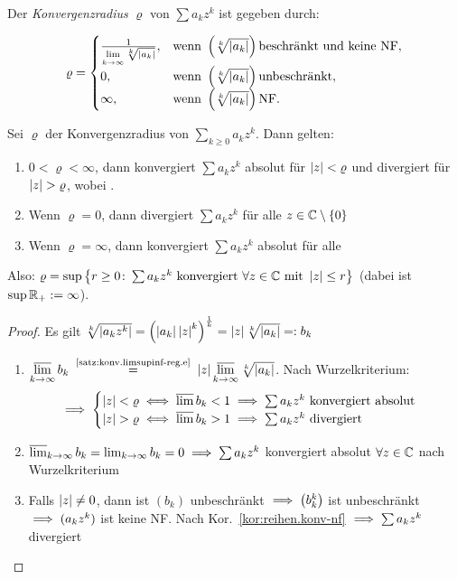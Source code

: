\documentclass[12pt]{scrreprt}
\begin{document}
\begin{dfn}\label{dfn:reihen.konvradius}
Der \emph{Konvergenzradius} $\varrho$ von $\sum a_kz^k$ ist gegeben durch:

\[\varrho = 
\begin{cases}
	\frac{1}{\lim\limits_{k\rightarrow\infty}\sqrt[k]{\left\lvert a_k\right\lvert}},	& \text{wenn } \left(\sqrt[k]{\left\lvert a_k\right\lvert}\right) \text{beschränkt und keine NF},\\
	0,											& \text{wenn } \left(\sqrt[k]{\left\lvert a_k\right\lvert}\right) \text{unbeschränkt},\\
	\infty,										& \text{wenn } \left(\sqrt[k]{\left\lvert a_k\right\lvert}\right) \text{NF}.
\end{cases}\]
\end{dfn}

\begin{thm}\label{thm:reihen.konvradius}
Sei $\varrho$ der Konvergenzradius von $\sum_{k \ge 0} a_kz^k$. Dann gelten:
\begin{enumerate}
\item $0 < \varrho < \infty$, dann konvergiert $\sum a_kz^k$ absolut für $\left\lvert z\right\lvert < \varrho$
und divergiert für $\left\lvert z\right\lvert > \varrho$, wobei .\label{thm:reihen.konvradius.a}
\item Wenn $\varrho = 0$, dann divergiert $\sum a_kz^k$ für alle $z\in\mathbb{C}\setminus\{0\}$\label{thm:reihen.konvradius.b}
\item Wenn $\varrho = \infty$, dann konvergiert $\sum a_kz^k$ absolut für alle \label{thm:reihen.konvradius.c}
\end{enumerate}
Also: $\varrho = \sup \left\{r \ge 0\colon \sum a_kz^k\text{ konvergiert }\forall z\in\mathbb{C}\text{ mit }\left\lvert z\right\lvert \le r\right\}$ 
(dabei ist $\sup \mathbb{R}_+ := \infty$).
\end{thm}
\begin{proof}
Es gilt $\sqrt[k]{\left\lvert a_kz^k\right\lvert} = \left(\left\lvert a_k\right\lvert\left\lvert z\right\lvert^k\right)^{\frac{1}{k}} = \left\lvert z\right\lvert\sqrt[k]{\left\lvert a_k\right\lvert} =: b_k$
\begin{enumerate}
\item $\ls\limits_{\kinf} b_k \nach{=}{\ref{satz:konv.limsupinf-reg.e}} \abs{z}\ls\limits_{\kinf}\sqrt[k]{\abs{a_k}}$.
Nach Wurzelkriterium: \[\implies \begin{cases}
	\left\lvert z\right\lvert < \varrho \iff \varlimsup b_k < 1 \implies \sum a_kz^k\text{ konvergiert absolut}\\
	\left\lvert z\right\lvert > \varrho \iff \varlimsup b_k > 1 \implies \sum a_kz^k\text{ divergiert}
\end{cases}\]
\setcounter{enumi}{2}
\item $\varlimsup_{k\rightarrow\infty} b_k = \lim_{k\rightarrow\infty} b_k = 0 \implies \sum a_kz^k$ konvergiert absolut 
$\forall z\in\mathbb{C}$ nach Wurzelkriterium
\setcounter{enumi}{1}
\item Falls $\left\lvert z\right\lvert \neq 0$, dann ist $(b_k)$ unbeschränkt $\implies \left(b_k^k\right)$ ist unbeschränkt
$\implies (a_kz^k)$ ist keine NF. Nach Kor.~\ref{kor:reihen.konv-nf} $\implies \sum a_kz^k$ divergiert
\end{enumerate}
\end{proof}
\end{document}
